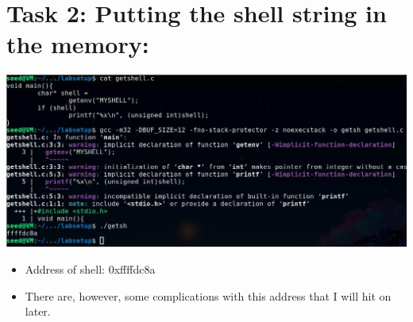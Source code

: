 \documentclass[11pt]{article}
\begin{document}
\section*{Task 2: Putting the shell string in the memory:}
\label{sec:org28df17e}
\begin{center}
\includegraphics[width=.9\linewidth]{./images/1.jpg}
\end{center}
\begin{itemize}
\item Address of shell: 0xffffdc8a
\item There are, however, some complications with this address that I will hit on later.
\end{itemize}
\end{document}
